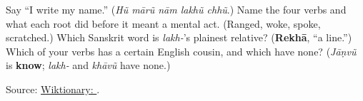 \begin{tcolorbox}[breakable,colback=teal!4,colframe=teal!35!black,title={Before you move on}]
Say \textquotedblleft{}I write my name.\textquotedblright{} (\emph{Hũ mārũ nām lakhũ chhũ}.) Name the four verbs and what each root did before it meant a mental act. (Ranged, woke, spoke, scratched.) Which Sanskrit word is \emph{lakh-}'s plainest relative? (\textbf{Rekhā}, \textquotedblleft{}a line.\textquotedblright{}) Which of your verbs has a certain English cousin, and which have none? (\emph{Jāṇvũ} is \textbf{know}; \emph{lakh-} and \emph{khāvũ} have none.)

Source: \href{https://en.wiktionary.org/wiki/\%E0\%AA\%B2\%E0\%AA\%96\%E0\%AA\%B5\%E0\%AB\%81\%E0\%AA\%82}{Wiktionary: }.
\end{tcolorbox}

